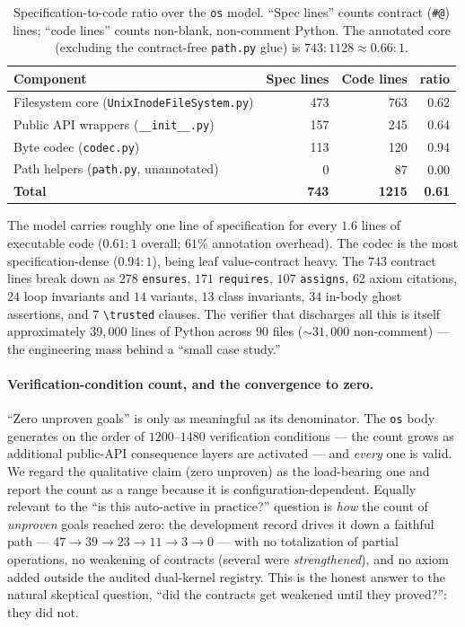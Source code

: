 \documentclass[11pt]{article}
\newcommand{\osmod}{\texttt{os}}
\begin{document}
\begin{table}[h]
\centering
\small
\begin{tabular}{@{}lrrr@{}}
\toprule
Component & Spec lines & Code lines & ratio \\
\midrule
Filesystem core (\texttt{UnixInodeFileSystem.py}) & 473 & 763 & 0.62 \\
Public API wrappers (\texttt{\_\_init\_\_.py})      & 157 & 245 & 0.64 \\
Byte codec (\texttt{codec.py})                      & 113 & 120 & 0.94 \\
Path helpers (\texttt{path.py}, unannotated)        &   0 &  87 & 0.00 \\
\midrule
\textbf{Total}                                      & \textbf{743} & \textbf{1215} & \textbf{0.61} \\
\bottomrule
\end{tabular}
\caption{Specification-to-code ratio over the \osmod{} model. ``Spec lines''
counts contract (\texttt{\#@}) lines; ``code lines'' counts non-blank,
non-comment Python. The annotated core (excluding the contract-free
\texttt{path.py} glue) is $743{:}1128 \approx 0.66{:}1$.}
\label{tab:metrics}
\end{table}

The model carries roughly one line of specification for every $1.6$ lines of
executable code ($0.61{:}1$ overall; $61\%$ annotation overhead). The codec is
the most specification-dense ($0.94{:}1$), being leaf value-contract heavy. The
$743$ contract lines break down as $278$ \texttt{ensures}, $171$
\texttt{requires}, $107$ \texttt{assigns}, $62$ axiom citations, $24$ loop
invariants and $14$ variants, $13$ class invariants, $34$ in-body ghost
assertions, and $7$ \texttt{\textbackslash trusted} clauses. The verifier that
discharges all this is itself approximately $39{,}000$ lines of Python across
$90$ files ($\sim\!31{,}000$ non-comment) --- the engineering mass behind a
``small case study.''

\paragraph{Verification-condition count, and the convergence to zero.}
``Zero unproven goals'' is only as meaningful as its denominator. The \osmod{}
body generates on the order of $1200$--$1480$ verification conditions ---
the count grows as additional public-API consequence layers are activated ---
and \emph{every} one is valid. We regard the qualitative claim (zero unproven)
as the load-bearing one and report the count as a range because it is
configuration-dependent. Equally relevant to the ``is this auto-active in
practice?'' question is \emph{how} the count of \emph{unproven} goals reached
zero: the development record drives it down a faithful path --- $47 \rightarrow
39 \rightarrow 23 \rightarrow 11 \rightarrow 3 \rightarrow 0$ --- with no
totalization of partial operations, no weakening of contracts (several were
\emph{strengthened}), and no axiom added outside the audited dual-kernel
registry. This is the honest answer to the natural skeptical question, ``did
the contracts get weakened until they proved?'': they did not.
\end{document}
